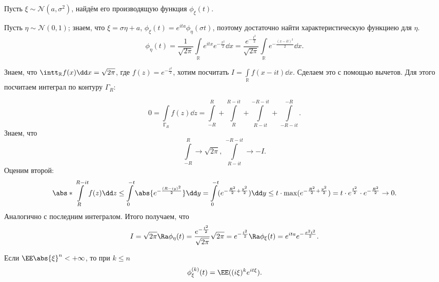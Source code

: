  \begin{example} Пусть $\xi\sim \mathcal{N}(a, \sigma^2)$, найдём его производящую функция $\phi_\xi (t)$.
 
     Пусть $\eta \sim \mathcal{N}(0, 1)$; знаем, что $\xi = \sigma\eta + a$, $\phi_\xi(t) = e^{ita}\phi_\eta(\sigma t)$,
     поэтому достаточно найти характеристическую функциею для $\eta$.
     $$\phi_\eta(t) = \frac{1}{\sqrt{2\pi}}\int\limits_\mathbb{R}e^{itx}e^{-\frac{x^2}{2}}\dd x =
         \frac{e^{-\frac{t^2}{2}}}{\sqrt{2\pi}}\int\limits_\mathbb{R}e^{-\frac{(x - it)^2}{2}}\dd x.$$

     Знаем, что $\intt_\mathbb{R}f(x) \dd x = \sqrt{2\pi}$, где $f(z) = e^{-\frac{z^2}{2}}$, хотим посчитать 
     $I = \int\limits_\mathbb{R}f(x-it)\dd x.$
     Сделаем это с помощью вычетов. Для этого посчитаем интеграл по контуру $\Gamma_R$:

      $$0 = \int\limits_{\text{Г}_R}f(z)\dd z = \int\limits_{-R}^R + \int\limits_R^{R - it} + \int\limits_{R - it}^{-R - it} + \int\limits_{-R - it}^{-R}.$$
      Знаем, что
      $$\int\limits_{-R}^R \to \sqrt{2\pi}, \ \int\limits_{R - it}^{-R - it}\to -I.$$
      Оценим второй: 
      $$\abs*{\int\limits_{R}^{R - it}f(z)\dd z} \le \int\limits_0^{-t}\abs{e^{-\frac{(R - iy)^2}{2}}}\dd y =
         \int\limits_0^{-t}(e^{-\frac{R^2}{2} + \frac{y^2}{2}})\dd y \le t\cdot \max (e^{-\frac{R^2}{2} + \frac{y^2}{2}}) =
         t\cdot e^{\frac{t^2}{2}}\cdot e^{-\frac{R^2}{2}} \to 0.$$ 
    Аналогично с последним интегралом. Итого получаем, что
     $$I = \sqrt{2\pi}\Ra\phi_\eta(t) = \frac{e^{-\frac{t^2}{2}}}{\sqrt{2\pi}}\sqrt{2\pi} =
         e^{-\frac{t^2}{2}} \Ra\phi_\xi(t) = e^{ita}e^{-\frac{\sigma^2t^2}{2}}.$$
 \end{example}

 \begin{theorem}
     Если $\EE \abs{\xi}^n < +\infty$, то при $k\le n$ 
     $$\phi_\xi^{(k)}(t) = \EE ((i\xi)^ke^{it\xi}).$$
 \end{theorem}

